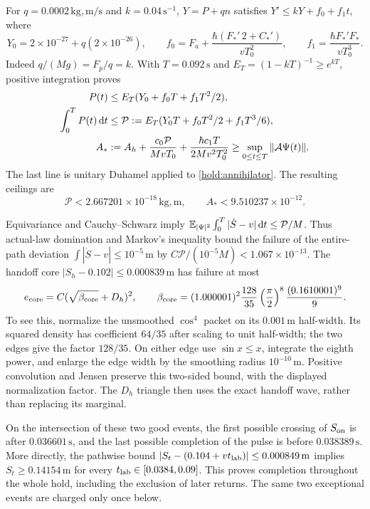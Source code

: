 \documentclass[11pt]{article}
\theoremstyle{definition}\newtheorem{definition}[theorem]{Definition}
\theoremstyle{remark}\newtheorem{remark}[theorem]{Remark}
\newcommand{\dd}{\,\mathrm d}\newcommand{\Imv}{\operatorname{Im}}\newcommand{\ii}{\mathrm i}
\begin{document}
For $q=0.0002\,\mathrm{kg,m/s}$ and $k=0.04\,\mathrm{s}^{-1}$,
$Y=P+qn$ satisfies $Y'\leq kY+f_0+f_1t$, where
\[
 Y_0=2\times10^{-27}+q(2\times10^{-26}),\qquad
 f_0=F_a+\frac{\hbar(F_*'\,2+C_*')}{vT_0^2},\qquad
 f_1=\frac{\hbar F_*'F_*}{vT_0^3}.
\]
Indeed $q/(Mg)=F_p/q=k$.  With $T=0.092\,\mathrm s$ and
$E_T=(1-kT)^{-1}\geq e^{kT}$, positive integration proves
\begin{align}
 P(t)&\leq E_T(Y_0+f_0T+f_1T^2/2),\notag\\
 \int_0^T P(t)\dd t&\leq
 \mathcal P:=E_T(Y_0T+f_0T^2/2+f_1T^3/6),\notag\\
 A_*&:=A_h+\frac{c_0\mathcal P}{MvT_0}
                +\frac{\hbar c_1T}{2Mv^2T_0^2}
       \geq\sup_{0\leq t\leq T}\|\mathcal A\Psi(t)\|.
 \label{hold:closedvalues}
\end{align}
The last line is unitary Duhamel applied to
\eqref{hold:annihilator}.  The resulting ceilings are
\[
 \mathcal P<2.667201\times10^{-18}\,\mathrm{kg,m},\qquad
 A_*<9.510237\times10^{-12}.
\]

Equivariance and Cauchy--Schwarz imply
$\E_{|\Psi|^2}\int_0^T|\dot S-v|\dd t\leq\mathcal P/M$.
Thus actual-law domination and Markov's inequality bound the failure
of the entire-path deviation $\int|\dot S-v|\leq10^{-5}\,\mathrm m$
by $C\mathcal P/(10^{-5}M)<1.067\times10^{-13}$.
The handoff core $|S_h-0.102|\leq0.000839\,\mathrm m$ has failure
at most
\begin{equation}\label{hold:core}
 e_{\rm core}=C(\sqrt{\beta_{\rm core}}+D_h)^2,
 \qquad
 \beta_{\rm core}=(1.000001)^2\frac{128}{35}
       \left(\frac{\pi}{2}\right)^8\frac{(0.1610001)^9}{9}.
\end{equation}
To see this, normalize the unsmoothed $\cos^4$ packet on its
$0.001\,\mathrm m$ half-width.  Its squared density has coefficient
$64/35$ after scaling to unit half-width; the two edges give the
factor $128/35$.  On either edge use
$\sin x\leq x$, integrate the eighth power, and enlarge the edge
width by the smoothing radius $10^{-10}\,\mathrm m$.
Positive convolution and Jensen preserve this two-sided bound,
with the displayed normalization factor.  The $D_h$ triangle then
uses the exact handoff wave, rather than replacing its marginal.

On the intersection of these two good events, the first possible
crossing of $S_{\rm on}$ is after $0.036601\,\mathrm s$, and the
last possible completion of the pulse is before
$0.038389\,\mathrm s$.  More directly, the pathwise bound
$|S_t-(0.104+vt_{\rm lab})|\leq0.000849\,\mathrm m$ implies
$S_t\geq0.14154\,\mathrm m$ for every
$t_{\rm lab}\in[0.0384,0.09]$.  This proves completion throughout
the whole hold, including the exclusion of later returns.  The same
two exceptional events are charged only once below.
\end{document}
